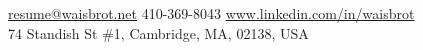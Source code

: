 \documentclass[10pt,a4paper]{article}
\begin{document}
\sloppy  %


\nobreakvspace{0.3em}  %

\noindent\href{mailto:resume@waisbrot.net}{resume@waisbrot.net} \sbull
{} 410-369-8043 \sbull
\href{https://www.linkedin.com/in/waisbrot}{www.linkedin.com/in/waisbrot}
\\
74 Standish St \#1, Cambridge, MA, 02138, USA

\spacedhrule{0.9em}{-0.4em}  %

\end{document}
